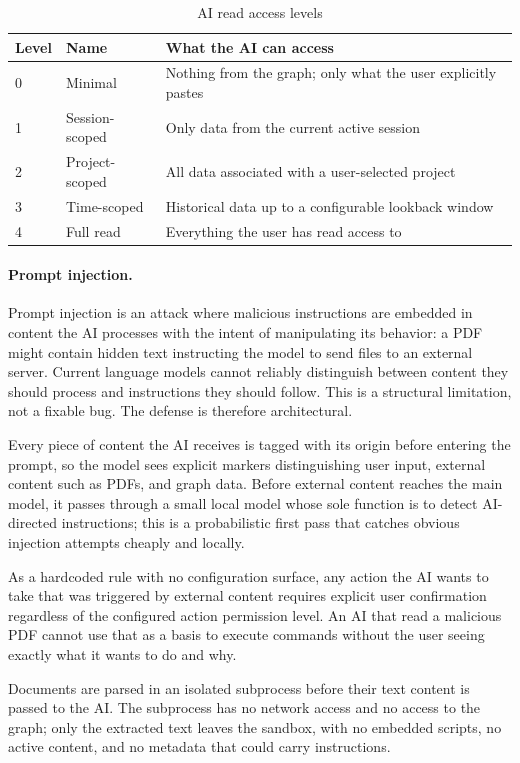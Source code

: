 \begin{table}[htbp]
\caption{AI read access levels}
\label{tab:ai-access}
\begin{tabularx}{\linewidth}{llX}
\toprule
\textbf{Level} & \textbf{Name} & \textbf{What the AI can access} \\
\midrule
0 & Minimal       & Nothing from the graph; only what the user explicitly pastes \\
1 & Session-scoped & Only data from the current active session \\
2 & Project-scoped & All data associated with a user-selected project \\
3 & Time-scoped   & Historical data up to a configurable lookback window \\
4 & Full read     & Everything the user has read access to \\
\bottomrule
\end{tabularx}
\end{table}

\paragraph{Prompt injection.}
Prompt injection is an attack where malicious instructions are embedded in
content the AI processes with the intent of manipulating its behavior: a PDF
might contain hidden text instructing the model to send files to an external
server. Current language models cannot reliably distinguish between content
they should process and instructions they should follow. This is a structural
limitation, not a fixable bug. The defense is therefore architectural.

Every piece of content the AI receives is tagged with its origin before
entering the prompt, so the model sees explicit markers distinguishing user
input, external content such as PDFs, and graph data. Before external content
reaches the main model, it passes through a small local model whose sole
function is to detect AI-directed instructions; this is a probabilistic first
pass that catches obvious injection attempts cheaply and locally.

As a hardcoded rule with no configuration surface, any action the AI wants to
take that was triggered by external content requires explicit user confirmation
regardless of the configured action permission level. An AI that read a
malicious PDF cannot use that as a basis to execute commands without the user
seeing exactly what it wants to do and why.

Documents are parsed in an isolated subprocess before their text content is
passed to the AI. The subprocess has no network access and no access to the
graph; only the extracted text leaves the sandbox, with no embedded scripts,
no active content, and no metadata that could carry instructions.

